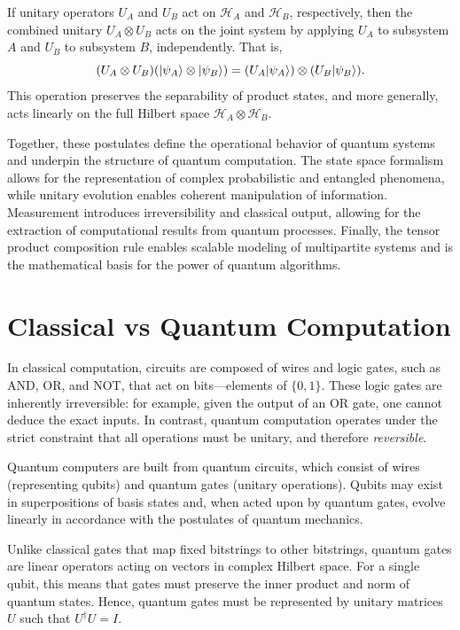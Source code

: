 \documentclass[12pt]{report}
\begin{document}
\begin{enumerate}
  If unitary operators \( U_A \) and \( U_B \) act on \( \mathcal{H}_A \) and \( \mathcal{H}_B \), respectively, then the combined unitary \( U_A \otimes U_B \) acts on the joint system by applying \( U_A \) to subsystem \( A \) and \( U_B \) to subsystem \( B \), independently. That is,
  \[
  (U_A \otimes U_B)(\lvert\psi_A\rangle \otimes \lvert\psi_B\rangle) = (U_A \lvert\psi_A\rangle) \otimes (U_B \lvert\psi_B\rangle).
  \]
  This operation preserves the separability of product states, and more generally, acts linearly on the full Hilbert space \( \mathcal{H}_A \otimes \mathcal{H}_B \).



\end{enumerate}

Together, these postulates define the operational behavior of quantum systems and underpin the structure of quantum computation. The state space formalism allows for the representation of complex probabilistic and entangled phenomena, while unitary evolution enables coherent manipulation of information. Measurement introduces irreversibility and classical output, allowing for the extraction of computational results from quantum processes. Finally, the tensor product composition rule enables scalable modeling of multipartite systems and is the mathematical basis for the power of quantum algorithms.


\section{Classical vs Quantum Computation}


In classical computation, circuits are composed of wires and logic gates, such as AND, OR, and NOT, that act on bits—elements of $\{0,1\}$. These logic gates are inherently irreversible: for example, given the output of an OR gate, one cannot deduce the exact inputs. In contrast, quantum computation operates under the strict constraint that all operations must be unitary, and therefore \emph{reversible}.

Quantum computers are built from quantum circuits, which consist of wires (representing qubits) and quantum gates (unitary operations). Qubits may exist in superpositions of basis states and, when acted upon by quantum gates, evolve linearly in accordance with the postulates of quantum mechanics.

Unlike classical gates that map fixed bitstrings to other bitstrings, quantum gates are linear operators acting on vectors in complex Hilbert space. For a single qubit, this means that gates must preserve the inner product and norm of quantum states. Hence, quantum gates must be represented by unitary matrices $U$ such that $U^\dagger U = I$.
\end{document}
